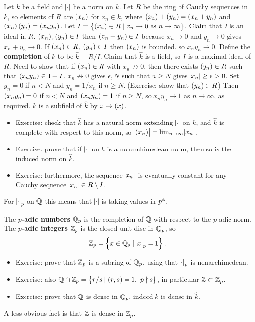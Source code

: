 Let $ k $ be a field and $ \abs{\cdot} $ be a norm on $ k $. Let $ R $ be the ring of Cauchy sequences in $ k $, so elements of $ R $ are $ \br{x_n} $ for $ x_n \in k $, where $ \br{x_n} + \br{y_n} = \br{x_n + y_n} $ and $ \br{x_n}\br{y_n} = \br{x_ny_n} $. Let $ I = \cbr{\br{x_n} \in R \mid x_n \to 0 \ \text{as} \ n \to \infty} $. Claim that $ I $ is an ideal in $ R $. $ \br{x_n}, \br{y_n} \in I $ then $ \br{x_n + y_n} \in I $ because $ x_n \to 0 $ and $ y_n \to 0 $ gives $ x_n + y_n \to 0 $. If $ \br{x_n} \in R $, $ \br{y_n} \in I $ then $ \br{x_n} $ is bounded, so $ x_ny_n \to 0 $. Define the \textbf{completion} of $ k $ to be $ \widehat{k} = R / I $. Claim that $ \widehat{k} $ is a field, so $ I $ is a maximal ideal of $ R $. Need to show that if $ \br{x_n} \in R $ with $ x_n \not\to 0 $, then there exists $ \br{y_n} \in R $ such that $ \br{x_ny_n} \in 1 + I $. $ x_n \not\to 0 $ gives $ \epsilon, N $ such that $ n \ge N $ gives $ \abs{x_n} \ge \epsilon > 0 $. Set $ y_n = 0 $ if $ n < N $ and $ y_n = 1 / x_n $ if $ n \ge N $. (Exercise: show that $ \br{y_n} \in R $) Then $ \br{x_ny_n} = 0 $ if $ n < N $ and $ \br{x_ny_n} = 1 $ if $ n \ge N $, so $ x_ny_n \to 1 $ as $ n \to \infty $, as required. $ k $ is a subfield of $ \widehat{k} $ by $ x \mapsto \br{x} $.
\begin{itemize}
\item Exercise: check that $ \widehat{k} $ has a natural norm extending $ \abs{\cdot} $ on $ k $, and $ \widehat{k} $ is complete with respect to this norm, so $ \abs{\br{x_n}} = \lim_{n \to \infty} \abs{x_n} $.
\item Exercise: prove that if $ \abs{\cdot} $ on $ k $ is a nonarchimedean norm, then so is the induced norm on $ \widehat{k} $.
\item Exercise: furthermore, the sequence $ \abs{x_n} $ is eventually constant for any Cauchy sequence $ \abs{x_n} \in R \setminus I $.
\end{itemize}

\begin{note*}
For $ \abs{\cdot}_p $ on $ \mathbb{Q} $ this means that $ \abs{\cdot} $ is taking values in $ p^{\mathbb{Z}} $.
\end{note*}

\begin{definition}
The \textbf{$ p $-adic numbers} $ \mathbb{Q}_p $ is the completion of $ \mathbb{Q} $ with respect to the $ p $-adic norm. The \textbf{$ p $-adic integers} $ \mathbb{Z}_p $ is the closed unit disc in $ \mathbb{Q}_p $, so
$$ \Z_p = \cbr{x \in \Q_p \mid \abs{x}_p = 1}. $$
\begin{itemize}
\item Exercise: prove that $ \mathbb{Z}_p $ is a subring of $ \mathbb{Q}_p $, using that $ \abs{\cdot}_p $ is nonarchimedean.
\item Exercise: also $ \Q \cap \Z_p = \cbr{r / s \mid \br{r, s} = 1, \ p \nmid s} $, in particular $ \mathbb{Z} \subset \mathbb{Z}_p $.
\item Exercise: prove that $ \mathbb{Q} $ is dense in $ \mathbb{Q}_p $, indeed $ k $ is dense in $ \widehat{k} $.
\end{itemize}
A less obvious fact is that $ \mathbb{Z} $ is dense in $ \mathbb{Z}_p $.
\end{definition}


